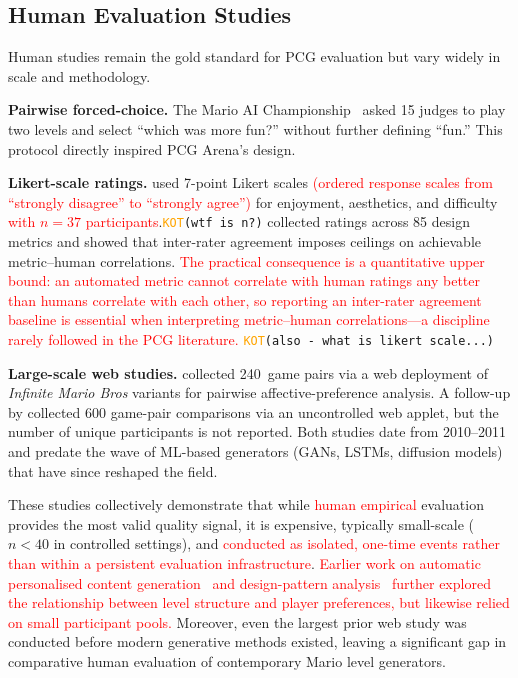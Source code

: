 \documentclass[shortabstract, mgr, english]{iithesis}
\newcommand{\DEBUG}[1]{{#1}} %
\newcommand{\KOT}[1]{\DEBUG{\tt{\textcolor{orange}{KOT}(}{#1}{)}}}
\newcommand{\changed}[1]{\textcolor{red}{#1}}
\begin{document}
\subsection{Human Evaluation Studies}
\label{subsec:bg-eval-human}

Human studies remain the gold standard for PCG evaluation but vary widely in
scale and methodology.

\textbf{Pairwise forced-choice.} The Mario AI
Championship~\citep{shaker2011mario} asked 15 judges to play two levels and
select ``which was more fun?'' without further defining ``fun.'' This protocol
directly inspired PCG Arena's design.

\textbf{Likert-scale ratings.} \citet{marino2015empirical} used 7-point Likert
scales \changed{(ordered response scales from ``strongly disagree'' to ``strongly agree'')}
for enjoyment, aesthetics, and difficulty \changed{with $n = 37$ participants}.\KOT{wtf is n?}
\citet{summerville2017understanding} collected ratings across 85 design metrics
and showed that inter-rater agreement imposes ceilings on achievable
metric--human correlations. \changed{The practical consequence is a quantitative
upper bound: an automated metric cannot correlate with human ratings any better
than humans correlate with each other, so reporting an inter-rater agreement
baseline is essential when interpreting metric--human correlations---a
discipline rarely followed in the PCG literature.}
\KOT{also - what is likert scale...}

\textbf{Large-scale web studies.} \citet{pedersen2010modeling} collected
240~game pairs via a web deployment of \emph{Infinite Mario Bros} variants
for pairwise affective-preference analysis.
A follow-up by \citet{shaker2011features} collected 600
game-pair comparisons via an uncontrolled web applet, but the number of unique
participants is not reported.
Both studies date from 2010--2011 and predate the wave of ML-based generators
(GANs, LSTMs, diffusion models) that have since reshaped the field.

These studies collectively demonstrate that while \changed{human empirical} evaluation provides the
most valid quality signal, it is expensive, typically small-scale ($n < 40$ in
controlled settings), and \changed{conducted as isolated, one-time events rather
than within a persistent evaluation infrastructure}.
\changed{Earlier work on automatic personalised content
generation~\citep{shaker2010towards} and design-pattern
analysis~\citep{dahlskog2013patterns} further explored the relationship between
level structure and player preferences, but likewise relied on small participant
pools.}
Moreover, even the largest prior web study was conducted before modern
generative methods existed, leaving a significant gap in comparative human
evaluation of contemporary Mario level generators.
\end{document}
